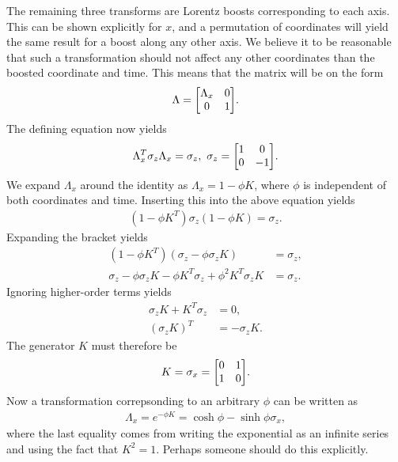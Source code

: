 The remaining three transforms are Lorentz boosts corresponding to each axis. This can be shown explicitly for $x$, and a permutation of coordinates will yield the same result for a boost along any other axis. We believe it to be reasonable that such a transformation should not affect any other coordinates than the boosted coordinate and time. This means that the matrix will be on the form
\begin{align*}
	\Lambda =
	\mqty[
		\Lambda_{x} & 0 \\
		0           & 1
	].
\end{align*}
The defining equation now yields
\begin{align*}
	\Lambda_{x}^{T}\sigma_{z}\Lambda_{x} = \sigma_{z}, \
	\sigma_{z} =
	\mqty[
		1 & 0 \\
		0 & -1
	].
\end{align*}
We expand $\Lambda_{x}$ around the identity as $\Lambda_{x} = 1 - \phi K$, where $\phi$ is independent of both coordinates and time. Inserting this into the above equation yields
\begin{align*}
	(1 - \phi K^{T})\sigma_{z}(1 - \phi K) = \sigma_{z}.
\end{align*}
Expanding the bracket yields
\begin{align*}
	(1 - \phi K^{T})(\sigma_{z} - \phi\sigma_{z}K)                                 &= \sigma_{z}, \\
	\sigma_{z} - \phi\sigma_{z}K - \phi K^{T}\sigma_{z} + \phi^{2}K^{T}\sigma_{z}K &= \sigma_{z}.
\end{align*}
Ignoring higher-order terms yields
\begin{align*}
	\sigma_{z}K + K^{T}\sigma_{z} &= 0, \\
	(\sigma_{z}K)^{T}             &= -\sigma_{z}K.
\end{align*}
The generator $K$ must therefore be
\begin{align*}
	K = \sigma_{x} =
	\mqty[
		0 & 1 \\
		1 & 0
	].
\end{align*}
Now a transformation correpsonding to an arbitrary $\phi$ can be written as
\begin{align*}
	\Lambda_{x} = e^{-\phi K} = \cosh{\phi} - \sinh{\phi}\sigma_{x},
\end{align*}
where the last equality comes from writing the exponential as an infinite series and using the fact that $K^{2} = 1$. Perhaps someone should do this explicitly.


